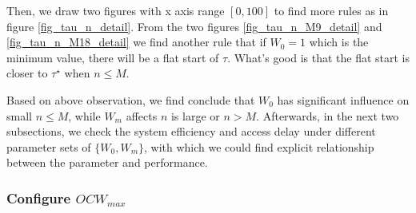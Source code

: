 Then, we draw two figures with x axis range $[0,100]$ to find more rules as in figure \ref{fig_tau_n_detail}. 
From the two figures \ref{fig_tau_n_M9_detail} and \ref{fig_tau_n_M18_detail} we find another rule that if $W_0=1$ which is the minimum value, there will be a flat start of $\tau$.
What's good is that the flat start is closer to $\tau^\star$ when $n\leq M$.

Based on above observation, we find conclude that $W_0$ has significant influence on small $n\leq M$, while $W_m$ affects $n$ is large or $n>M$. 
Afterwards, in the next two subsections, we check the system efficiency and access delay under different parameter sets of $\lbrace W_0, W_m \rbrace$, with which we could find explicit relationship between the parameter and performance.




\subsubsection{Configure $OCW_{max}$}

